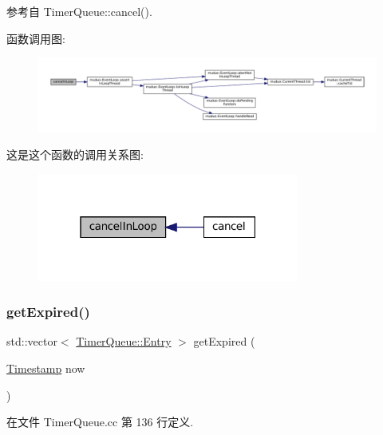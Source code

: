 参考自 Timer\+Queue\+::cancel().

函数调用图\+:
\nopagebreak
\begin{figure}[H]
\begin{center}
\leavevmode
\includegraphics[width=350pt]{classmuduo_1_1TimerQueue_abc59bed63190c00d9aab9281a543ea58_cgraph}
\end{center}
\end{figure}
这是这个函数的调用关系图\+:
\nopagebreak
\begin{figure}[H]
\begin{center}
\leavevmode
\includegraphics[width=244pt]{classmuduo_1_1TimerQueue_abc59bed63190c00d9aab9281a543ea58_icgraph}
\end{center}
\end{figure}
\mbox{\label{classmuduo_1_1TimerQueue_a4475fc9e3cda425c7f71b9d3e00e840a}} 
\subsubsection{\texorpdfstring{get\+Expired()}{getExpired()}}
{\footnotesize\ttfamily std\+::vector$<$ \hyperlink{classmuduo_1_1TimerQueue_aa2bab77baf38279fd11dcfcbf8fb15d8}{Timer\+Queue\+::\+Entry} $>$ get\+Expired (\begin{DoxyParamCaption}\item[{\hyperlink{classmuduo_1_1Timestamp}{Timestamp}}]{now }\end{DoxyParamCaption})\hspace{0.3cm}{\ttfamily [private]}}



在文件 Timer\+Queue.\+cc 第 136 行定义.



